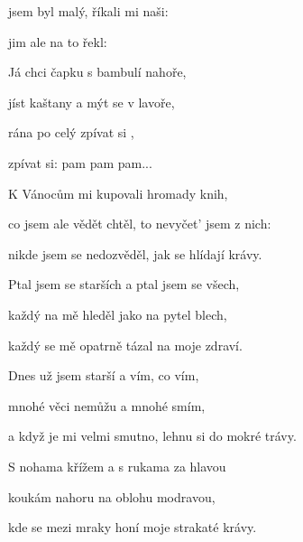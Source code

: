 

\zs
{} jsem byl malý, říkali mi naši:


 jim ale na to řekl: 
\ks

\zr
Já chci  čapku s bambulí nahoře,

jíst kaštany a mýt se v lavoře,

 rána po celý  zpívat si ,

zpívat si: pam pam pam...   
\kr

\zs
K Vánocům mi kupovali hromady knih,

co jsem ale vědět chtěl, to nevyčet' jsem z nich:

nikde jsem se nedozvěděl, jak se hlídají krávy.

Ptal jsem se starších a ptal jsem se všech,

každý na mě hleděl jako na pytel blech,

každý se mě opatrně tázal na moje zdraví.
\ks

\zr  \kr

\zs
Dnes už jsem starší a vím, co vím,

mnohé věci nemůžu a mnohé smím,

a když je mi velmi smutno, lehnu si do mokré trávy.

S nohama křížem a s rukama za hlavou

koukám nahoru na oblohu modravou,

kde se mezi mraky honí moje strakaté krávy.
\ks

\zr  \kr

\kp






